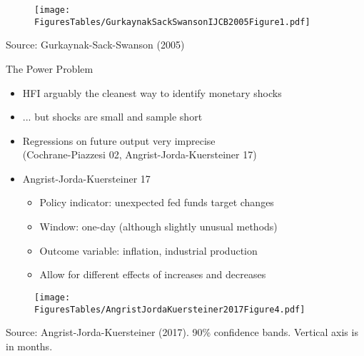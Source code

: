 \documentclass[11pt,aspectratio=169,xcolor={dvipsnames},hyperref={pdftex,pdfpagemode=UseNone,hidelinks,pdfdisplaydoctitle=true},usepdftitle=false]{beamer}
\begin{document}
\begin{frame}
\begin{figure}
\centering
\texttt{[image: FiguresTables/GurkaynakSackSwansonIJCB2005Figure1.pdf]}
\end{figure}
\vspace{-6mm}
{\scriptsize Source: Gurkaynak-Sack-Swanson (2005)}
\end{frame}


\begin{frame}{The Power Problem}
\begin{itemize}
\item HFI arguably the cleanest way to identify monetary shocks
\item[] ... but shocks are small and sample short
\item Regressions on future output very imprecise \\ (Cochrane-Piazzesi 02, Angrist-Jorda-Kuersteiner 17)
\item Angrist-Jorda-Kuersteiner 17
\begin{itemize}
\item Policy indicator: unexpected fed funds target changes
\item Window: one-day (although slightly unusual methods)
\item Outcome variable: inflation, industrial production
\item Allow for different effects of increases and decreases
\end{itemize}
\end{itemize}		
\end{frame}


\begin{frame}
\begin{figure}
\centering
\texttt{[image: FiguresTables/AngristJordaKuersteiner2017Figure4.pdf]}
\end{figure}
\vspace{-6mm}
{\scriptsize Source: Angrist-Jorda-Kuersteiner (2017). 90\% confidence bands. Vertical axis is in months.}
\end{frame}
\end{document}
